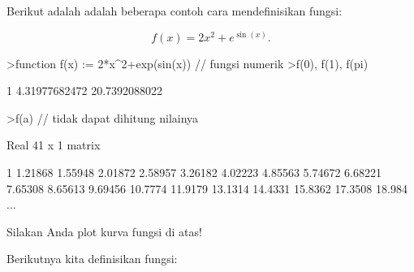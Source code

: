 \documentclass[a4paper,10pt]{article}
\begin{document}
\begin{eulernotebook}
\begin{eulercomment}
\begin{eulercomment}
\begin{eulercomment}
\begin{eulercomment}
\begin{eulercomment}
\begin{eulercomment}
\begin{eulercomment}
\begin{eulercomment}
\begin{eulercomment}
\begin{eulercomment}
\begin{eulercomment}
\begin{eulercomment}
\begin{eulercomment}
\begin{eulercomment}
\begin{eulercomment}
\begin{eulercomment}
\begin{eulercomment}
Berikut adalah adalah beberapa contoh cara mendefinisikan fungsi:

\end{eulercomment}
\begin{eulerformula}
\[
f(x)=2x^2+e^{\sin(x)}.
\]
\end{eulerformula}
\begin{eulerprompt}
>function f(x) := 2*x^2+exp(sin(x)) // fungsi numerik
>f(0), f(1), f(pi)
\end{eulerprompt}
\begin{euleroutput}
  1
  4.31977682472
  20.7392088022
\end{euleroutput}
\begin{eulerprompt}
>f(a) // tidak dapat dihitung nilainya
\end{eulerprompt}
\begin{euleroutput}
  Real 41 x 1 matrix
  
              1 
        1.21868 
        1.55948 
        2.01872 
        2.58957 
        3.26182 
        4.02223 
        4.85563 
        5.74672 
        6.68221 
        7.65308 
        8.65613 
        9.69456 
        10.7774 
        11.9179 
        13.1314 
        14.4331 
        15.8362 
        17.3508 
         18.984 
      ...
\end{euleroutput}
\begin{eulercomment}
Silakan Anda plot kurva fungsi di atas!

Berikutnya kita definisikan fungsi:


\end{eulercomment}
\end{eulercomment}
\end{eulercomment}
\end{eulercomment}
\end{eulercomment}
\end{eulercomment}
\end{eulercomment}
\end{eulercomment}
\end{eulercomment}
\end{eulercomment}
\end{eulercomment}
\end{eulercomment}
\end{eulercomment}
\end{eulercomment}
\end{eulercomment}
\end{eulercomment}
\end{eulercomment}
\end{eulernotebook}
\end{document}
